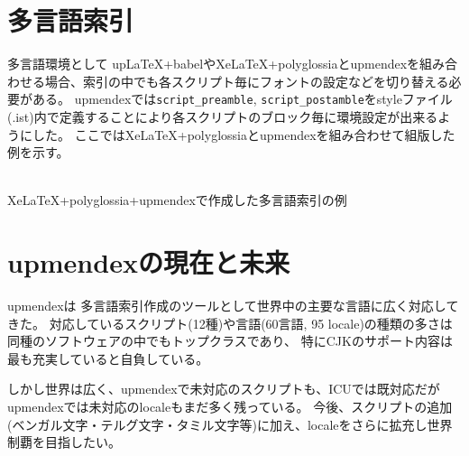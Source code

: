 \documentclass[a4paper]{article}
\begin{document}
\section*{多言語索引}
多言語環境として upLaTeX+babelやXeLaTeX+polyglossiaとupmendexを組み合わせる場合、索引の中でも各スクリプト毎にフォントの設定などを切り替える必要がある。
upmendexでは{\texttt{script\_preamble}}, {\texttt{script\_postamble}}をstyleファイル(.ist)内で定義することにより各スクリプトのブロック毎に環境設定が出来るようにした。
ここではXeLaTeX+polyglossiaとupmendexを組み合わせて組版した例を示す。

\begin{center}
\\[2mm]%
XeLaTeX+polyglossia+upmendexで作成した多言語索引の例
\end{center}

\section*{upmendexの現在と未来}
upmendexは%
多言語索引作成のツールとして世界中の主要な言語に広く対応してきた。
対応しているスクリプト(12種)や言語(60言語, 95 locale)の種類の多さは同種のソフトウェアの中でもトップクラスであり、
特にCJKのサポート内容は最も充実していると自負している。

しかし世界は広く、upmendexで未対応のスクリプトも、ICUでは既対応だがupmendexでは未対応のlocaleもまだ多く残っている。
今後、スクリプトの追加(ベンガル文字・テルグ文字・タミル文字等)に加え、localeをさらに拡充し世界制覇を目指したい。

\end{document}
